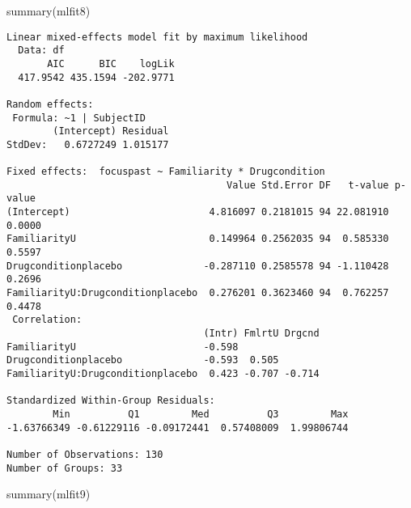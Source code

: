 \documentclass[
  man,
  longtable,
  nolmodern,
  notxfonts,
  notimes,
  colorlinks=true,linkcolor=blue,citecolor=blue,urlcolor=blue]{apa7}
\newenvironment{Shaded}{\begin{snugshade}}{\end{snugshade}}
\newcommand{\FunctionTok}[1]{\textcolor[rgb]{0.28,0.35,0.67}{#1}}
\newcommand{\NormalTok}[1]{\textcolor[rgb]{0.00,0.23,0.31}{#1}}
\begin{document}
\begin{Shaded}
\begin{Highlighting}[]
\FunctionTok{summary}\NormalTok{(mlfit8)}
\end{Highlighting}
\end{Shaded}

\begin{verbatim}
Linear mixed-effects model fit by maximum likelihood
  Data: df 
       AIC      BIC    logLik
  417.9542 435.1594 -202.9771

Random effects:
 Formula: ~1 | SubjectID
        (Intercept) Residual
StdDev:   0.6727249 1.015177

Fixed effects:  focuspast ~ Familiarity * Drugcondition 
                                      Value Std.Error DF   t-value p-value
(Intercept)                        4.816097 0.2181015 94 22.081910  0.0000
FamiliarityU                       0.149964 0.2562035 94  0.585330  0.5597
Drugconditionplacebo              -0.287110 0.2585578 94 -1.110428  0.2696
FamiliarityU:Drugconditionplacebo  0.276201 0.3623460 94  0.762257  0.4478
 Correlation: 
                                  (Intr) FmlrtU Drgcnd
FamiliarityU                      -0.598              
Drugconditionplacebo              -0.593  0.505       
FamiliarityU:Drugconditionplacebo  0.423 -0.707 -0.714

Standardized Within-Group Residuals:
        Min          Q1         Med          Q3         Max 
-1.63766349 -0.61229116 -0.09172441  0.57408009  1.99806744 

Number of Observations: 130
Number of Groups: 33 
\end{verbatim}

\begin{Shaded}
\begin{Highlighting}[]
\FunctionTok{summary}\NormalTok{(mlfit9)}
\end{Highlighting}
\end{Shaded}
\end{document}
